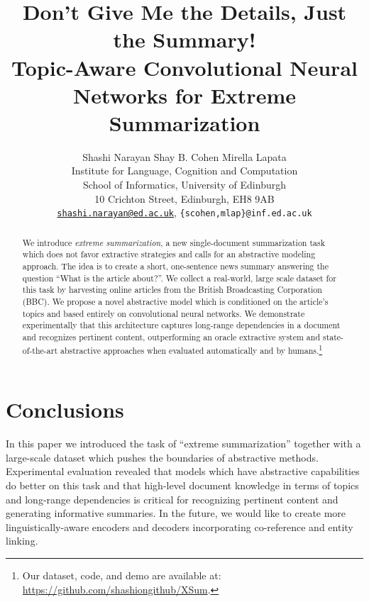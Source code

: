 \documentclass[11pt,a4paper]{article}
\title{Don't Give Me the Details, Just the Summary! \\Topic-Aware
  Convolutional Neural Networks for Extreme Summarization}
\author{Shashi Narayan \quad Shay B. Cohen \quad Mirella Lapata \\ 
  Institute for Language, Cognition and Computation \\
  School of Informatics, University of Edinburgh \\ 
  10 Crichton Street, Edinburgh, EH8 9AB  \\ 
  \texttt{\url{shashi.narayan@ed.ac.uk}},
  \texttt{\{scohen,mlap\}@inf.ed.ac.uk} 
}
\date{}
\begin{document}
\maketitle
\begin{abstract}

  We introduce \emph{extreme summarization}, a new single-document
  summarization task which does not favor extractive strategies and
  calls for an abstractive modeling approach. The idea is to create a
  short, one-sentence news summary answering the question ``What is
  the article about?''. We collect a real-world, large scale dataset
  for this task by harvesting online articles from the British
  Broadcasting Corporation (BBC). We propose a novel abstractive model
  which is conditioned on the article's topics and based entirely on
  convolutional neural networks.  We demonstrate experimentally that
  this architecture captures long-range dependencies in a document and
  recognizes pertinent content, outperforming an oracle extractive
  system and state-of-the-art abstractive approaches when evaluated
  automatically and by humans.\footnote{Our dataset, code, and demo
    are available at: \url{https://github.com/shashiongithub/XSum}.}

\end{abstract}











\section{Conclusions}

In this paper we introduced the task of ``extreme summarization''
together with a large-scale dataset which pushes the boundaries of
abstractive methods.  Experimental evaluation revealed that models
which have abstractive capabilities do better on this task and that
high-level document knowledge in terms of topics and long-range
dependencies is critical for recognizing pertinent content and
generating informative summaries. In the future, we would like to
create more linguistically-aware encoders and decoders incorporating
co-reference and entity linking.
\end{document}
